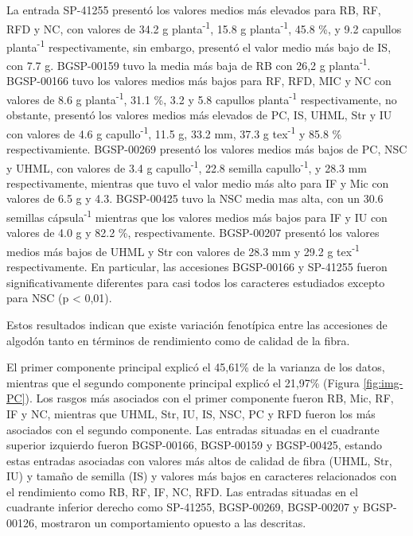 \documentclass[12pt,oneside]{reedthesis}
\begin{document}
La entrada SP-41255 presentó los valores medios más elevados para RB, RF, RFD y NC, con valores de 34.2 g planta\textsuperscript{-1}, 15.8 g planta\textsuperscript{-1}, 45.8 \%, y 9.2 capullos planta\textsuperscript{-1} respectivamente, sin embargo, presentó el valor medio más bajo de IS, con 7.7 g. BGSP-00159 tuvo la media más baja de RB con 26,2 g planta\textsuperscript{-1}. BGSP-00166 tuvo los valores medios más bajos para RF, RFD, MIC y NC con valores de 8.6 g planta\textsuperscript{-1}, 31.1 \%, 3.2 y 5.8 capullos planta\textsuperscript{-1} respectivamente, no obstante, presentó los valores medios más elevados de PC, IS, UHML, Str y IU con valores de 4.6 g capullo\textsuperscript{-1}, 11.5 g, 33.2 mm, 37.3 g tex\textsuperscript{-1} y 85.8 \% respectivamiente. BGSP-00269 presentó los valores medios más bajos de PC, NSC y UHML, con valores de 3.4 g capullo\textsuperscript{-1}, 22.8 semilla capullo\textsuperscript{-1}, y 28.3 mm respectivamente, mientras que tuvo el valor medio más alto para IF y Mic con valores de 6.5 g y 4.3. BGSP-00425 tuvo la NSC media mas alta, con un 30.6 semillas cápsula\textsuperscript{-1} mientras que los valores medios más bajos para IF y IU con valores de 4.0 g y 82.2 \%, respectivamente. BGSP-00207 presentó los valores medios más bajos de UHML y Str con valores de 28.3 mm y 29.2 g tex\textsuperscript{-1} respectivamente. En particular, las accesiones BGSP-00166 y SP-41255 fueron significativamente diferentes para casi todos los caracteres estudiados excepto para NSC (p \textless{} 0,01).

Estos resultados indican que existe variación fenotípica entre las accesiones de algodón tanto en términos de rendimiento como de calidad de la fibra.

El primer componente principal explicó el 45,61\% de la varianza de los datos, mientras que el segundo componente principal explicó el 21,97\% (Figura \ref{fig:img-PC}). Los rasgos más asociados con el primer componente fueron RB, Mic, RF, IF y NC, mientras que UHML, Str, IU, IS, NSC, PC y RFD fueron los más asociados con el segundo componente. Las entradas situadas en el cuadrante superior izquierdo fueron BGSP-00166, BGSP-00159 y BGSP-00425, estando estas entradas asociadas con valores más altos de calidad de fibra (UHML, Str, IU) y tamaño de semilla (IS) y valores más bajos en caracteres relacionados con el rendimiento como RB, RF, IF, NC, RFD. Las entradas situadas en el cuadrante inferior derecho como SP-41255, BGSP-00269, BGSP-00207 y BGSP-00126, mostraron un comportamiento opuesto a las descritas.
\end{document}
